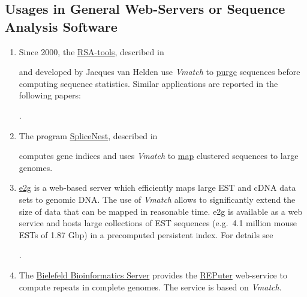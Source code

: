 \documentclass[12pt]{article}
\newcommand{\Vmatch}[0]{\textit{Vmatch}\xspace}
\begin{document}
\subsection*{Usages in General Web-Servers or Sequence Analysis Software}
\begin{enumerate}
\item
Since 2000,
the \href{http://rsat.ulb.ac.be/rsat/}{RSA-tools}, described in


and developed by Jacques van Helden
use \Vmatch to \href{http://rsat.ulb.ac.be/rsat/purge-sequence_form.cgi}{purge}
sequences before computing sequence statistics. Similar applications are
reported in the following papers:



.

\item
The program \href{http://splicenest.molgen.mpg.de/}{SpliceNest}, described in


computes gene indices and uses \Vmatch to
\href{http://splicenest.molgen.mpg.de/doc/help.html\#mapping}{map} clustered
sequences to large genomes.
\item
\href{http://bibiserv.techfak.uni-bielefeld.de/e2g/}{e2g}
is a web-based server which efficiently maps large
EST and cDNA data sets to genomic DNA. The use of \Vmatch
allows to significantly extend the size of data that can be mapped in
reasonable time. e2g is available as a web service and hosts
large collections of EST sequences (e.g.\ 4.1 million mouse ESTs
of 1.87 Gbp) in a precomputed persistent index. For details see

.

\item
The \href{http://bibiserv.techfak.uni-bielefeld.de/}{Bielefeld Bioinformatics Server} provides the
\href{http://bibiserv.techfak.uni-bielefeld.de/reputer/}{REPuter}
web-service to compute repeats in complete genomes. The service is based on
\Vmatch.


\end{enumerate}
\end{document}
